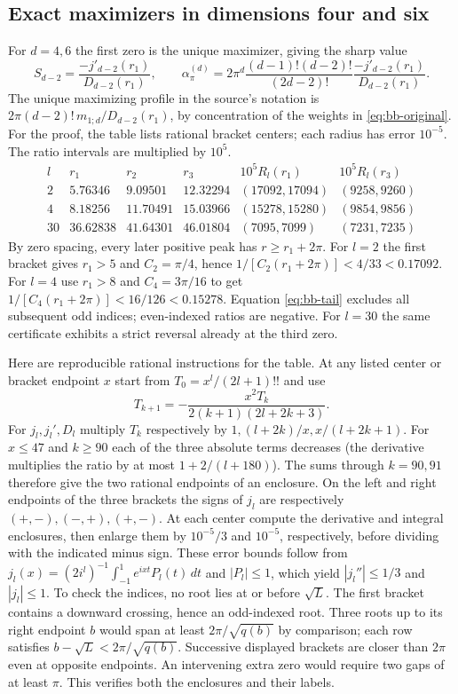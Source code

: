 \documentclass[11pt,a4paper]{article}
\theoremstyle{remark}\newtheorem{remark}[theorem]{Remark}
\numberwithin{equation}{section}
\begin{document}
\subsection{Exact maximizers in dimensions four and six}
For $d=4,6$ the first zero is the unique maximizer, giving the sharp value
\[
 S_{d-2}=\frac{-j'_{d-2}(r_1)}{D_{d-2}(r_1)},\qquad
 \alpha_\pi^{(d)}=2\pi^d\frac{(d-1)!(d-2)!}{(2d-2)!}
 \frac{-j'_{d-2}(r_1)}{D_{d-2}(r_1)} .
\]
The unique maximizing profile in the source's notation is
$2\pi(d-2)!\,m_{1;d}/D_{d-2}(r_1)$, by concentration of the weights in
\eqref{eq:bb-original}.
For the proof, the table lists rational bracket centers; each radius
has error $10^{-5}$. The ratio intervals are multiplied by $10^5$.
\[
\begin{array}{c|rrr|rr}
 l&r_1&r_2&r_3&10^5R_l(r_1)&10^5R_l(r_3)\\ \hline
 2&5.76346&9.09501&12.32294&(17092,17094)&(9258,9260)\\
 4&8.18256&11.70491&15.03966&(15278,15280)&(9854,9856)\\
 30&36.62838&41.64301&46.01804&(7095,7099)&(7231,7235)
\end{array}
\]
By zero spacing, every later positive peak has $r\ge r_1+2\pi$.
For $l=2$ the first bracket gives $r_1>5$ and $C_2=\pi/4$, hence
$1/[C_2(r_1+2\pi)]<4/33<0.17092$. For $l=4$ use $r_1>8$ and
$C_4=3\pi/16$ to get $1/[C_4(r_1+2\pi)]<16/126<0.15278$.
Equation \eqref{eq:bb-tail} excludes all subsequent odd indices;
even-indexed ratios are negative. For $l=30$ the same
certificate exhibits a strict reversal already at the third zero.

Here are reproducible rational instructions for the table. At any listed
center or bracket endpoint $x$ start from $T_0=x^l/(2l+1)!!$ and use
\[
 T_{k+1}=-\frac{x^2 T_k}{2(k+1)(2l+2k+3)} .
\]
For $j_l,j_l',D_l$ multiply $T_k$ respectively by
$1,(l+2k)/x,x/(l+2k+1)$. For $x\le47$ and $k\ge90$ each of the three
absolute terms decreases (the derivative multiplies the ratio by at most
$1+2/(l+180)$). The sums through $k=90,91$ therefore give the two
rational endpoints of an enclosure. On the left and right endpoints of
the three brackets the signs of $j_l$ are respectively $(+,-),(-,+),(+,-)$.
At each center compute the derivative and integral enclosures, then enlarge
them by $10^{-5}/3$ and $10^{-5}$, respectively, before dividing with the
indicated minus sign. These error bounds follow from
$j_l(x)=(2i^l)^{-1}\int_{-1}^1e^{ixt}P_l(t)\,dt$ and $|P_l|\le1$,
which yield $|j_l''|\le1/3$ and $|j_l|\le1$.
To check the indices, no root lies at or before $\sqrt L$. The first
bracket contains a downward crossing, hence an odd-indexed root. Three
roots up to its right endpoint $b$ would span at least $2\pi/\sqrt{q(b)}$
by comparison; each row satisfies $b-\sqrt L<2\pi/\sqrt{q(b)}$.
Successive displayed brackets are closer than $2\pi$ even at opposite
endpoints. An intervening extra zero would require two gaps of at least
$\pi$. This verifies both the enclosures and their labels.
\end{document}
